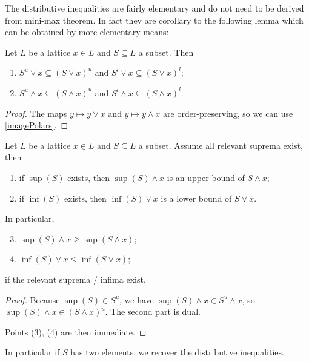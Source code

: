 The distributive inequalities are fairly elementary and do not need to be derived from mini-max theorem. 
In fact they are corollary to the following lemma which can be obtained by more elementary means:
\begin{lemma} \label{UpperLowerBoundsMeetJoin}
Let $L$ be a lattice $x\in L$ and $S\subseteq L$ a subset. Then
\begin{enumerate}
\item $S^u\vee x \subseteq (S\vee x)^u$ and $S^l\vee x \subseteq (S\vee x)^l$;
\item $S^u\wedge x \subseteq (S\wedge x)^u$ and $S^l\wedge x \subseteq (S\wedge x)^l$.
\end{enumerate}
\end{lemma}
\begin{proof}
The maps $y\mapsto y\vee x$ and $y\mapsto y \wedge x$ are order-preserving, so we can use \ref{imagePolars}.
\end{proof}
\begin{corollary} \label{infiniteDistributiveInequalities}
Let $L$ be a lattice $x\in L$ and $S\subseteq L$ a subset. Assume all relevant suprema exist, then
\begin{enumerate}
\item if $\sup(S)$ exists, then $\sup(S) \wedge x$ is an upper bound of $S\wedge x$;
\item if $\inf(S)$ exists, then $\inf(S) \vee x$ is a lower bound of $S\vee x$.
\end{enumerate}
In particular,
\begin{enumerate} \setcounter{enumi}{2}
\item $\sup(S)\wedge x \geq \sup(S \wedge x)$;
\item $\inf(S)\vee x \leq \inf(S \vee x)$;
\end{enumerate}
if the relevant suprema / infima exist.
\end{corollary}
\begin{proof}
Because $\sup(S)\in S^u$, we have $\sup(S)\wedge x \in S^u\wedge x$, so $\sup(S)\wedge x \in (S\wedge x)^u$. The second part is dual.

Points (3), (4) are then immediate.
\end{proof}
In particular if $S$ has two elements, we recover the distributive inequalities.

